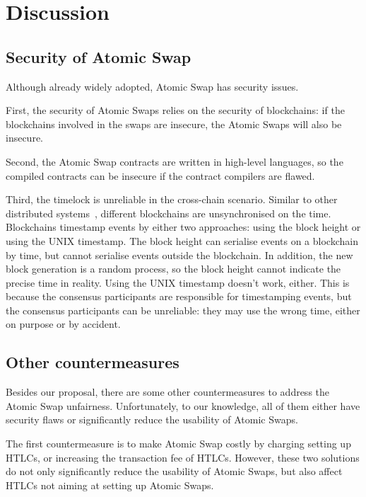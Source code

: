 \section{Discussion}
\label{sec:discussion}

\subsection{Security of Atomic Swap}

Although already widely adopted, Atomic Swap has security issues.

First, the security of Atomic Swaps relies on the security of blockchains:
if the blockchains involved in the swaps are insecure, the Atomic Swaps will also be insecure.

Second, the Atomic Swap contracts are written in high-level languages, so the compiled contracts can be insecure if the contract compilers are flawed.

Third, the timelock is unreliable in the cross-chain scenario.
Similar to other distributed systems~\cite{coulouris2012distributed}, different blockchains are unsynchronised on the time.
Blockchains timestamp events by either two approaches: using the block height or using the UNIX timestamp.
The block height can serialise events on a blockchain by time, but cannot serialise events outside the blockchain.
In addition, the new block generation is a random process, so the block height cannot indicate the precise time in reality.
Using the UNIX timestamp doesn't work, either.
This is because the consensus participants are responsible for timestamping events, but the consensus participants can be unreliable:
they may use the wrong time, either on purpose or by accident.


\subsection{Other countermeasures}

Besides our proposal, there are some other countermeasures to address the Atomic Swap unfairness.
Unfortunately, to our knowledge, all of them either have security flaws or significantly reduce the usability of Atomic Swaps.

The first countermeasure is to make Atomic Swap costly by charging setting up HTLCs, or increasing the transaction fee of HTLCs.
However, these two solutions do not only significantly reduce the usability of Atomic Swaps, but also affect HTLCs not aiming at setting up Atomic Swaps.

